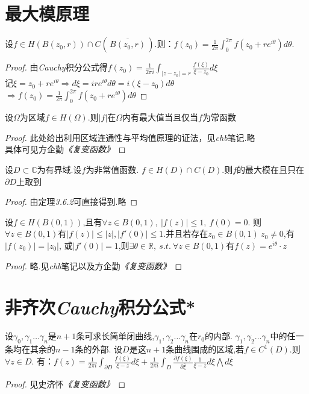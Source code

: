 \section{最大模原理}
\begin{mypro}[平均值定理]
	设$f\in H(B(z_0,r))\cap C(\,\overline{B(z_0,r)}\,)$.则：$\displaystyle{f(z_0)=\frac{1}{2\pi}\int_0^{2\pi}f(z_0+re^{i\theta})d\theta}$.
\end{mypro}
\begin{proof}
	由\emph{Cauchy}积分公式得$\displaystyle{f(z_0)=\frac{1}{2\pi i}\int_{|z-z_0|=r}\frac{f(\xi)}{\xi-z_0}d\xi}$\\
	记$\displaystyle{\xi=z_0+re^{i\theta}\Rightarrow d\xi=ire^{i\theta}d\theta=i(\xi-z_0)d\theta}$\\
	$\displaystyle{\Rightarrow f(z_0)=\frac{1}{2\pi}\int_0^{2\pi}f(z_0+re^{i\theta})d\theta}$
\end{proof}
\begin{mypro}[最大模定理]
	设$\Omega$为区域$f\in H(\Omega)$.则$|f|$在$\Omega$内有最大值当且仅当$f$为常函数
\end{mypro}
\begin{proof}
	此处给出利用区域连通性与平均值原理的证法，见\emph{chb}笔记.略\\
	具体可见方企勤\emph{《复变函数》}
\end{proof}

\begin{mypro}
	设$D\subset\mathbb{C}$为有界域.设$f$为非常值函数.
	$f\in H(D)\cap C(D)$.则$f$的最大模在且只在$\partial D$上取到
\end{mypro}
\begin{proof}
	由定理\emph{3.6.2}可直接得到.略
\end{proof}

\begin{mypro}[Schwarz引理]
	设$f\in H(B(0,1))$,且有$\forall z\in B(0,1),\ |f(z)|\leq1,\ f(0)=0$.
	则$\forall z\in B(0,1)$有$|f(z)|\leq|z|,|f'(0)|\leq1.$并且若存在$z_0\in B(0,1)\ z_0\neq 0$,有$|f(z_0)|=|z_0|$,
	或$|f'(0)|=1$,则$\exists\theta\in\mathbb{R},\ s.t.\ \forall z\in B(0,1)$有$f(z)=e^{i\theta}\cdot z$
\end{mypro}
\begin{proof}
	略.见\emph{chb}笔记以及方企勤\emph{《复变函数》}
\end{proof}

\section{非齐次\emph{Cauchy}积分公式*}
\begin{mypro}
	设$\gamma_0,\gamma_1\dots \gamma_n$是$n+1$条可求长简单闭曲线,$\gamma_1,\gamma_2\dots \gamma_n$在$r_0$的内部.
	$\gamma_1,\gamma_2\dots \gamma_n$中的任一条均在其余的$n-1$条的外部.
	设$D$是这$n+1$条曲线围成的区域,若$f\in C^1(D)$.则$\forall z\in D$.
	有：$\displaystyle{f(z)=\frac{1}{2\pi i}\int_{\partial D}\frac{f(\xi)}{\xi-z}d\xi
		+\frac{1}{2\pi i}\int_D\frac{\partial f(\xi)}{\partial\overline{\xi}}\frac{1}{\xi-z}d\xi\bigwedge d\overline{\xi}}$
\end{mypro}
\begin{proof}
	见史济怀\emph{《复变函数》}
\end{proof}